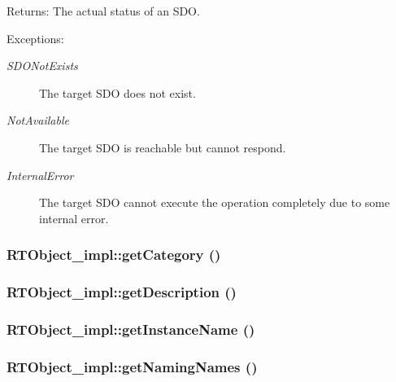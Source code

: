 \begin{Desc}
\item[Returns:]The actual status of an SDO. \end{Desc}
\begin{Desc}
\item[Exceptions:]
\begin{description}
\item[{\em SDONot\-Exists}]The target SDO does not exist. \item[{\em Not\-Available}]The target SDO is reachable but cannot respond. \item[{\em Internal\-Error}]The target SDO cannot execute the operation completely due to some internal error.\end{description}
\end{Desc}
\subsubsection{\setlength{\rightskip}{0pt plus 5cm}RTObject\_\-impl::get\-Category ()}\label{classRTObject__impl_RTObject__impla54}


\subsubsection{\setlength{\rightskip}{0pt plus 5cm}RTObject\_\-impl::get\-Description ()}\label{classRTObject__impl_RTObject__impla51}


\subsubsection{\setlength{\rightskip}{0pt plus 5cm}RTObject\_\-impl::get\-Instance\-Name ()}\label{classRTObject__impl_RTObject__impla48}


\subsubsection{\setlength{\rightskip}{0pt plus 5cm}RTObject\_\-impl::get\-Naming\-Names ()}\label{classRTObject__impl_RTObject__impla55}


